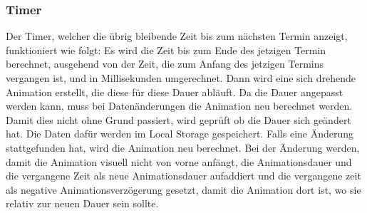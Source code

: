 \subsubsection{Timer}
Der Timer, welcher die übrig bleibende Zeit bis zum nächsten Termin anzeigt, funktioniert wie folgt:
\newline
\newline
Es wird die Zeit bis zum Ende des jetzigen Termin berechnet, ausgehend von der Zeit, die zum Anfang des jetzigen Termins vergangen ist, und in Millisekunden umgerechnet.
Dann wird eine sich drehende Animation erstellt, die diese für diese Dauer abläuft.
\newline
Da die Dauer angepasst werden kann, muss bei Datenänderungen die Animation neu berechnet werden.
Damit dies nicht ohne Grund passiert, wird geprüft ob die Dauer sich geändert hat.
Die Daten dafür werden im Local Storage gespeichert.
Falls eine Änderung stattgefunden hat, wird die Animation neu berechnet.
Bei der Änderung werden, damit die Animation visuell nicht von vorne anfängt, die Animationsdauer und die vergangene Zeit als neue Animationsdauer aufaddiert und die vergangene zeit als negative Animationsverzögerung gesetzt, damit die Animation dort ist, wo sie relativ zur neuen Dauer sein sollte.
\newline
